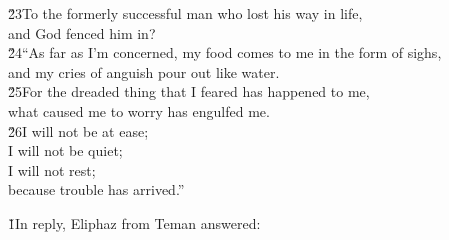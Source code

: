 \begin{poetry}
\poeml \v{23}To the formerly successful man who lost his way in life, \\
\poemll    and God fenced him in? \\
\poeml \v{24}``As far as I'm concerned, my food comes to me in the form of sighs, \\
\poemll    and my cries of anguish pour out like water. \\
\poeml \v{25}For the dreaded thing that I feared has happened to me, \\
\poemll    what caused me to worry has engulfed me. \\
\poeml \v{26}I will not be at ease; \\
\poemll    I will not be quiet; \\
\poeml I will not rest; \\
\poemll    because trouble has arrived.''
\end{poetry}

\v{1}In reply, Eliphaz from Teman answered:

